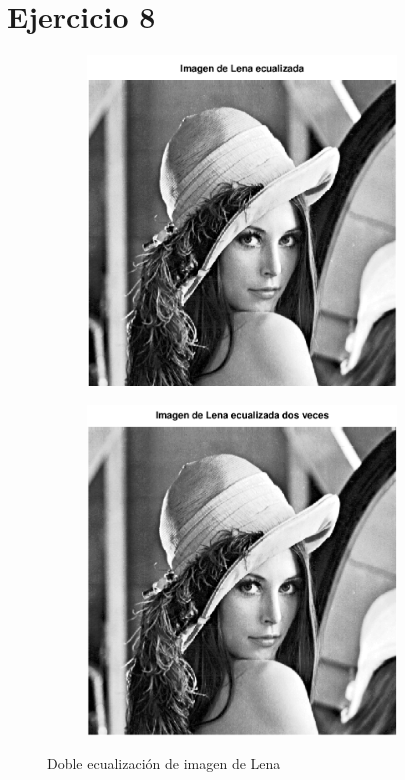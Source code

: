 \documentclass{article}
\begin{document}
\section*{Ejercicio 8}
\begin{figure}[H]
    \begin{subfigure}{0.5\textwidth}
        \includegraphics[width=0.9\textwidth]{lenaEcualizada.png} %
    \end{subfigure}\hfill
    \begin{subfigure}{0.5\textwidth}
        \includegraphics[width=0.9\textwidth]{lenaEqEq.png} %
    \end{subfigure}
    \caption{Doble ecualización de imagen de Lena}
\end{figure}
\end{document}
